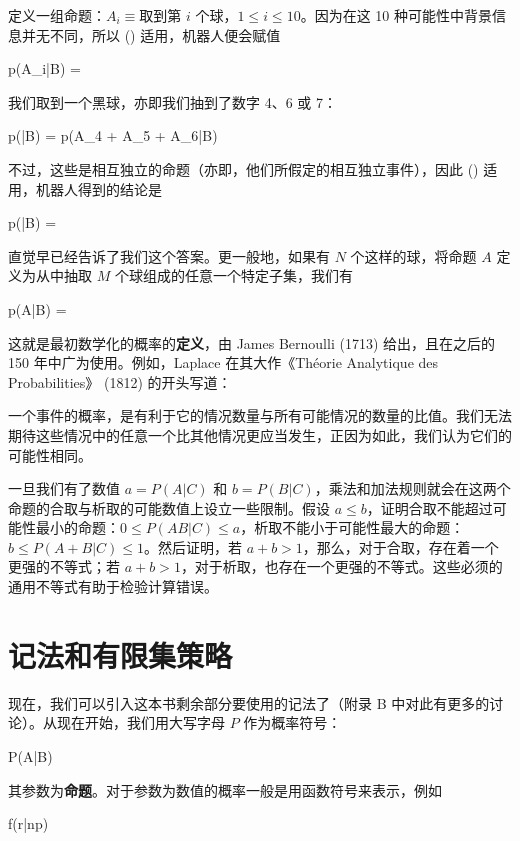 定义一组命题：$A_i\equiv\text{取到第 } i\text{ 个球}$，$1\le i\le 10$。因为在这 10 种可能性中背景信息并无不同，所以 (\in[2-95]) 适用，机器人便会赋值

\placeformula[2-96]
\startformula
p(A_i|B) = 
\stopformula

我们取到一个黑球，亦即我们抽到了数字 4、6 或 7：

\placeformula[2-97]
\startformula
p(|B) = p(A_4 + A_5 + A_6|B)
\stopformula

不过，这些是相互独立的命题（亦即，他们所假定的相互独立事件），因此 (\in[2-85]) 适用，机器人得到的结论是

\placeformula[2-98]
\startformula
p(|B) = 
\stopformula

直觉早已经告诉了我们这个答案。更一般地，如果有 $N$ 个这样的球，将命题 $A$ 定义为从中抽取 $M$ 个球组成的任意一个特定子集，我们有

\placeformula[2-99]
\startformula
p(A|B) = 
\stopformula

这就是最初数学化的概率的{\bf 定义}，由 James Bernoulli (1713) 给出，且在之后的 150 年中广为使用。例如，Laplace 在其大作《Th\'eorie Analytique des Probabilities》 (1812) 的开头写道：

{\small 一个事件的概率，是有利于它的情况数量与所有可能情况的数量的比值。我们无法期待这些情况中的任意一个比其他情况更应当发生，正因为如此，我们认为它们的可能性相同。}

\startframedtext[width=broad]
\exercise{} 一旦我们有了数值 $a = P(A|C)$ 和 $b = P(B|C)$，乘法和加法规则就会在这两个命题的合取与析取的可能数值上设立一些限制。假设 $a\le b$，证明合取不能超过可能性最小的命题：$0\le P(AB|C) \le a$，析取不能小于可能性最大的命题：$b \le P(A+B|C) \le 1$。然后证明，若 $a + b > 1$，那么，对于合取，存在着一个更强的不等式；若 $a + b > 1$，对于析取，也存在一个更强的不等式。这些必须的通用不等式有助于检验计算错误。
\stopframedtext

\section{记法和有限集策略}

现在，我们可以引入这本书剩余部分要使用的记法了（附录 B 中对此有更多的讨论）。从现在开始，我们用大写字母 $P$ 作为概率符号：

\placeformula[2-100]
\startformula
P(A|B)
\stopformula

其参数为{\bf 命题}。对于参数为数值的概率一般是用函数符号来表示，例如

\placeformula[2-101]
\startformula
f(r|np)
\stopformula

